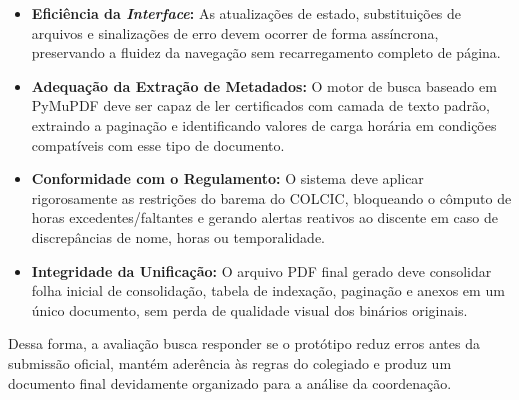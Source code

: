 \begin{itemize}
    \item \textbf{Eficiência da \textit{Interface}:} As atualizações de estado, substituições de arquivos e sinalizações de erro devem ocorrer de forma assíncrona, preservando a fluidez da navegação sem recarregamento completo de página.
    \item \textbf{Adequação da Extração de Metadados:} O motor de busca baseado em PyMuPDF deve ser capaz de ler certificados com camada de texto padrão, extraindo a paginação e identificando valores de carga horária em condições compatíveis com esse tipo de documento.
    \item \textbf{Conformidade com o Regulamento:} O sistema deve aplicar rigorosamente as restrições do barema do COLCIC, bloqueando o cômputo de horas excedentes/faltantes e gerando alertas reativos ao discente em caso de discrepâncias de nome, horas ou temporalidade.
    \item \textbf{Integridade da Unificação:} O arquivo PDF final gerado deve consolidar folha inicial de consolidação, tabela de indexação, paginação e anexos em um único documento, sem perda de qualidade visual dos binários originais.
\end{itemize}

Dessa forma, a avaliação busca responder se o protótipo reduz erros antes da submissão oficial, mantém aderência às regras do colegiado e produz um documento final devidamente organizado para a análise da coordenação.
